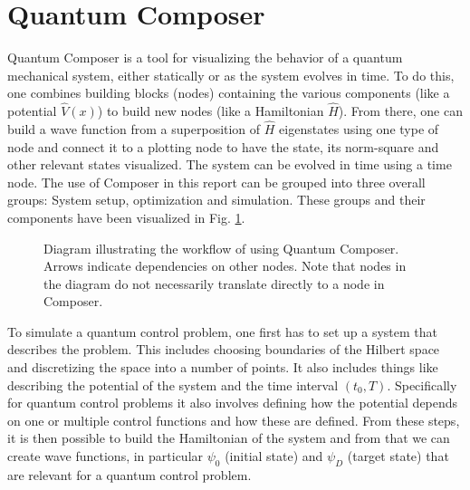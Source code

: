 \documentclass[a4paper, twocolumn]{revtex4-1}
\begin{document}
\section{Quantum Composer}\label{sec:Composer}
Quantum Composer is a tool for visualizing the behavior of a quantum mechanical system, either statically or as the system evolves in time. To do this, one combines building blocks (nodes) containing the various components (like a potential $\hat{V}(x)$) to build new nodes (like a Hamiltonian $\hat{H}$). From there, one can build a wave function from a superposition of $\hat{H}$ eigenstates using one type of node and connect it to a plotting node to have the state, its norm-square and other relevant states visualized. The system can be evolved in time using a time node. The use of Composer in this report can be grouped into three overall groups: System setup,  optimization and simulation. These groups and their components have been visualized in Fig. \ref{fig:flowdiagram}. 

\begin{figure}
\def\svgwidth{\textwidth}
	
	\caption{Diagram illustrating the workflow of using Quantum Composer. Arrows indicate dependencies on other nodes. Note that nodes in the diagram do not necessarily translate directly to a node in Composer.}
	\label{fig:flowdiagram}
\end{figure}

To simulate a quantum control problem, one first has to set up a system that describes the problem. This includes choosing boundaries of the Hilbert space and discretizing the space into a number of points. It also includes things like describing the potential of the system and the time interval $(t_0, T)$. Specifically for quantum control problems it also involves defining how the potential depends on one or multiple control functions and how these are defined. From these steps, it is then possible to build the Hamiltonian of the system and from that we can create wave functions, in particular $\psi_0$ (initial state) and $\psi_D$ (target state) that are relevant for a quantum control problem.
\end{document}
